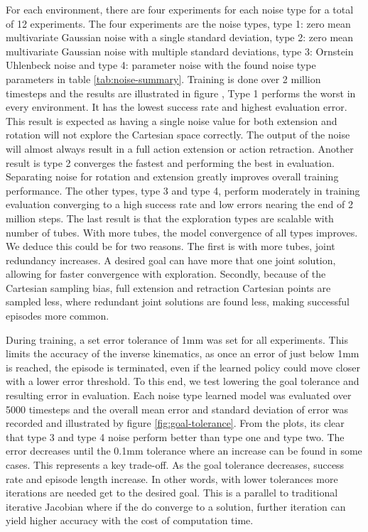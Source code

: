 For each environment, there are four experiments for each noise type for a total of 12 experiments. The four experiments are the noise types, type 1: zero mean multivariate Gaussian noise with a single standard deviation, type 2: zero mean multivariate Gaussian noise with multiple standard deviations, type 3: Ornstein Uhlenbeck noise and type 4: parameter noise with the found noise type parameters in table \ref{tab:noise-summary}. Training is done over 2 million timesteps and the results are illustrated in figure \cite{fig:learning}, Type 1 performs the worst in every environment. It has the lowest success rate and highest evaluation error. This result is expected as having a single noise value for both extension and rotation will not explore the Cartesian space correctly. The output of the noise will almost always result in a full action extension or action retraction. Another result is type 2 converges the fastest and performing the best in evaluation. Separating noise for rotation and extension greatly improves overall training performance. The other types, type 3 and type 4, perform moderately in training evaluation converging to a high success rate and low errors nearing the end of 2 million steps. The last result is that the exploration types are scalable with number of tubes. With more tubes, the model convergence of all types improves. We deduce this could be for two reasons. The first is with more tubes, joint redundancy increases. A desired goal can have more that one joint solution, allowing for faster convergence with exploration. Secondly, because of the Cartesian sampling bias, full extension and retraction Cartesian points are sampled less, where redundant joint solutions are found less, making successful episodes more common.

During training, a set error tolerance of 1mm was set for all experiments. This limits the accuracy of the inverse kinematics, as once an error of just below 1mm is reached, the episode is terminated, even if the learned policy could move closer with a lower error threshold. To this end, we test lowering the goal tolerance and resulting error in evaluation. Each noise type learned model was evaluated over 5000 timesteps and the overall mean error and standard deviation of error was recorded and illustrated by figure \ref{fig:goal-tolerance}. From the plots, its clear that type 3 and type 4 noise perform better than type one and type two. The error decreases until the 0.1mm tolerance where an increase can be found in some cases. This represents a key trade-off. As the goal tolerance decreases, success rate and episode length increase. In other words, with lower tolerances more iterations are needed get to the desired goal. This is a parallel to traditional iterative Jacobian where if the do converge to a solution, further iteration can yield higher accuracy with the cost of computation time.

